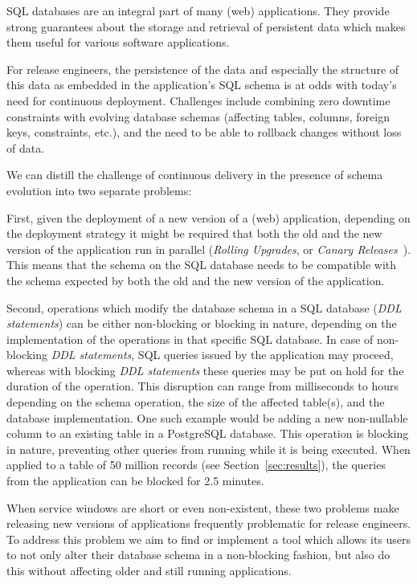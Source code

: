 \documentclass[conference]{IEEEtran}
\begin{document}

SQL databases are an integral part of many (web) applications. They provide strong guarantees about the storage and retrieval of persistent data which makes them useful for various software applications. 

For release engineers, the persistence of the data and especially the structure of this data as embedded in the application's SQL schema is at odds with today's need for continuous deployment. Challenges include combining zero downtime constraints with evolving database schemas (affecting tables, columns, foreign keys, constraints, etc.), and the need to be able to rollback changes without loss of data.

We can distill the challenge of continuous delivery in the presence of schema evolution into two separate problems:

First, given the deployment of a new version of a (web) application, depending on the deployment strategy it might be required that both the old and the new version of the application run in parallel (\textit{Rolling Upgrades}, or \textit{Canary Releases}~\cite{Humble:2010:CDR:1869904}). This means that the schema on the SQL database needs to be compatible with the schema expected by both the old and the new version of the application.

Second, operations which modify the database schema in a SQL database (\textit{DDL statements}) can be either non-blocking or blocking in nature, depending on the implementation of the operations in that specific SQL database. In case of non-blocking \textit{DDL statements}, SQL queries issued by the application may proceed, whereas with blocking \textit{DDL statements} these queries may be put on hold for the duration of the operation. This disruption can range from milliseconds to hours depending on the schema operation, the size of the affected table(s), and the database implementation. One such example would be adding a new non-nullable column to an existing table in a PostgreSQL database. This operation is blocking in nature, preventing other queries from running while it is being executed. When applied to a table of 50 million records (see Section~\ref{sec:results}), the queries from the application can be blocked for 2.5 minutes.


When service windows are short or even non-existent, these two problems make releasing new versions of applications frequently problematic for release engineers. To address this problem we aim to find or implement a tool which  allows its users to not only alter their database schema in a non-blocking fashion, but also do this without affecting older and still running applications.
\end{document}
